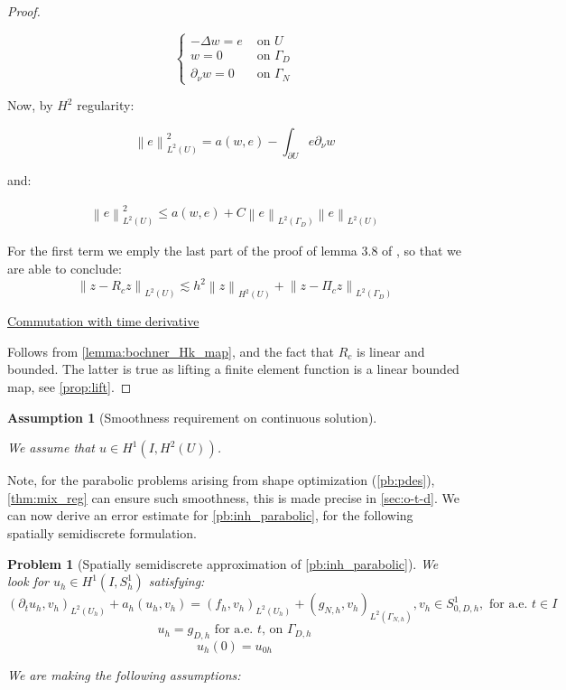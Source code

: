 \documentclass[english,a4paper,9pt,oneside]{scrbook}	%
\theoremstyle{break}
\newtheorem{ass}[equation]{Assumption}
\newtheorem{pb}[equation]{Problem}
\newenvironment{mproof}[1][\proofname]{%
  \begin{proof}[#1]$ $\par\nobreak\ignorespaces
}{%
  \end{proof}
}
\renewcommand*{\proofname}{Proof}
\theoremstyle{remark}
\newcommand{\norm}[1]{\left\lVert#1\right\rVert}
\begin{document}
\begin{appendices}
\begin{mproof}
$$
\left\{\begin{matrix}
-\Delta w = e & \text{ on } U \\ 
w = 0 & \text{ on } \Gamma_D \\ 
\partial_\nu w = 0 & \text{ on } \Gamma_N 
\end{matrix}\right.
$$

Now, by $H^2$ regularity:

$$\norm{e}^2_{L^2(U)} = a(w,e) - \int_{\partial U} e \partial_\nu w  $$

and:

\begin{align*}
\norm{e}^2_{L^2(U)} \leq a(w,e) + C \norm{e}_{L^2(\Gamma_D)}\norm{e}_{L^2( U)} 
\end{align*}

For the first term we emply the last part of the proof of lemma 3.8 of \cite{ranner}, so that we are able to conclude:
$$\norm{z-R_c z}_{L^2(U)}\lesssim h^2\norm{z}_{H^2(U)} + \norm{z-\Pi_c z}_{L^2(\Gamma_D)} $$

\underline{Commutation with time derivative}

Follows from \cref{lemma:bochner_Hk_map}, and the fact that $R_c$ is linear and bounded. The latter is true as lifting a finite element function is a linear bounded map, see \cref{prop:lift}.
\end{mproof}

\begin{ass}[Smoothness requirement on continuous solution]
\label{ass:smoothness_par_discr}

We assume that $u \in H^1(I, H^2(U))$.
\end{ass}

Note, for the parabolic problems arising from shape optimization (\cref{pb:pdes}), \cref{thm:mix_reg} can ensure such smoothness, this is made precise in \cref{sec:o-t-d}.
We can now derive an error estimate for \cref{pb:inh_parabolic}, for the following spatially semidiscrete formulation.

\begin{pb}[Spatially semidiscrete approximation of \cref{pb:inh_parabolic}]
\label{pb:inh_parabolic_discr}
We look for $u_h \in H^1(I, S^1_h)$ satisfying: 
$$(\partial_t u_h, v_h)_{L^2(U_h)} + a_h(u_h, v_h) = (f_h, v_h)_{L^2(U_h)} + (g_{N,h}, v_h)_{L^2(\Gamma_{N,h})}, v_h \in S^1_{0,D,h}, \text{ for a.e. }t\in I$$
$$u_h=g_{D,h}\text{ for a.e. }t \text{,  on } \Gamma_{D,h}$$
$$u_h(0)=u_{0h}$$

We are making the following assumptions:


\end{pb}
\end{appendices}
\end{document}
